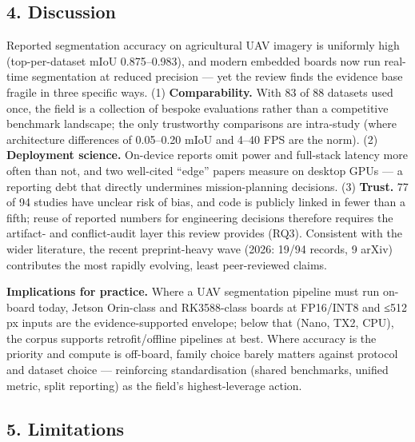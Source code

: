 \documentclass[11pt]{article}
\begin{document}
\subsection{4. Discussion}\label{discussion}

Reported segmentation accuracy on agricultural UAV imagery is uniformly
high (top-per-dataset mIoU 0.875--0.983), and modern embedded boards now
run real-time segmentation at reduced precision --- yet the review finds
the evidence base fragile in three specific ways. (1)
\textbf{Comparability.} With 83 of 88 datasets used once, the field is a
collection of bespoke evaluations rather than a competitive benchmark
landscape; the only trustworthy comparisons are intra-study (where
architecture differences of 0.05--0.20 mIoU and 4--40 FPS are the norm).
(2) \textbf{Deployment science.} On-device reports omit power and
full-stack latency more often than not, and two well-cited ``edge''
papers measure on desktop GPUs --- a reporting debt that directly
undermines mission-planning decisions. (3) \textbf{Trust.} 77 of 94
studies have unclear risk of bias, and code is publicly linked in fewer
than a fifth; reuse of reported numbers for engineering decisions
therefore requires the artifact- and conflict-audit layer this review
provides (RQ3). Consistent with the wider literature, the recent
preprint-heavy wave (2026: 19/94 records, 9 arXiv) contributes the most
rapidly evolving, least peer-reviewed claims.

\textbf{Implications for practice.} Where a UAV segmentation pipeline
must run on-board today, Jetson Orin-class and RK3588-class boards at
FP16/INT8 and ≤512 px inputs are the evidence-supported envelope; below
that (Nano, TX2, CPU), the corpus supports retrofit/offline pipelines at
best. Where accuracy is the priority and compute is off-board, family
choice barely matters against protocol and dataset choice ---
reinforcing standardisation (shared benchmarks, unified metric, split
reporting) as the field's highest-leverage action.

\subsection{5. Limitations}\label{limitations}
\end{document}
